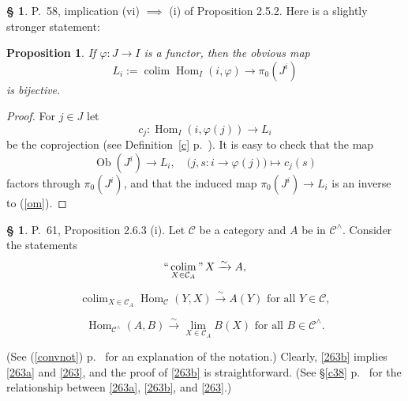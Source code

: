 \documentclass[12pt]{article}
\newtheorem{prop}[thm]{Proposition}
\theoremstyle{remark}
\theoremstyle{definition}
\newtheorem{s}[thm]{\S}
\newcommand{\C}{\mathcal C}
\newcommand{\cn}{(See (\ref{convnot}) p.~\pageref{convnot} for an explanation of the notation.) }
\DeclareMathOperator*{\coli}{colim}
\DeclareMathOperator*{\co}{colim}
\DeclareMathOperator*{\ic}{``\coli"}
\DeclareMathOperator{\Hom}{Hom}%
\DeclareMathOperator{\Ob}{Ob}
\begin{document}
%
%
\begin{s} 
P.~58, implication (vi) $\implies$ (i) of Proposition 2.5.2. Here is a slightly stronger statement:
%
\begin{prop} 
If $\varphi:J\to I$ is a functor, then the obvious map
\begin{equation}\label{om}
L_i:=\coli\Hom_I(i,\varphi)\to\pi_0(J^i)
\end{equation}
is bijective. 
\end{prop}
% 
\begin{proof}
For $j\in J$ let 
$$
c_j:\Hom_I(i,\varphi(j))\to L_i
$$
be the coprojection (see Definition~\ref{c} p.~\pageref{c}). It is easy to check that the map 
$$
\Ob(J^i)\to L_i,\quad\big(j,s:i\to\varphi(j)\big)\mapsto c_j(s)
$$
factors through $\pi_0(J^i)$, and that the induced map $\pi_0(J^i)\to L_i$ is an inverse to (\ref{om}).
\end{proof}
\end{s}
%
%
\begin{s} 
P.~61, Proposition 2.6.3 (i). Let $\C$ be a category and $A$ be in $\C^\wedge$. Consider the statements
%
\begin{equation}\label{263a}
\ic_{X\in\C_A}X\xrightarrow\sim A,
\end{equation} 

\begin{equation}\label{263b}
\co_{X\in\C_A}\Hom_\C(Y,X)\xrightarrow\sim A(Y)\text{ for all }Y\in\C, 
\end{equation}

\begin{equation}\label{263} 
\Hom_{\C^\wedge}(A,B)\xrightarrow\sim\lim_{X\in\C_A}B(X)\text{ for all }B\in\C^\wedge. 
\end{equation} 

\noindent\cn Clearly, \eqref{263b} implies \eqref{263a} and \eqref{263}, and the proof of \eqref{263b} is straightforward. (See \S\ref{c38} p.~\pageref{c38} for the relationship between \eqref{263a}, \eqref{263b}, and \eqref{263}.)
\end{s}
%
%
\end{document}
